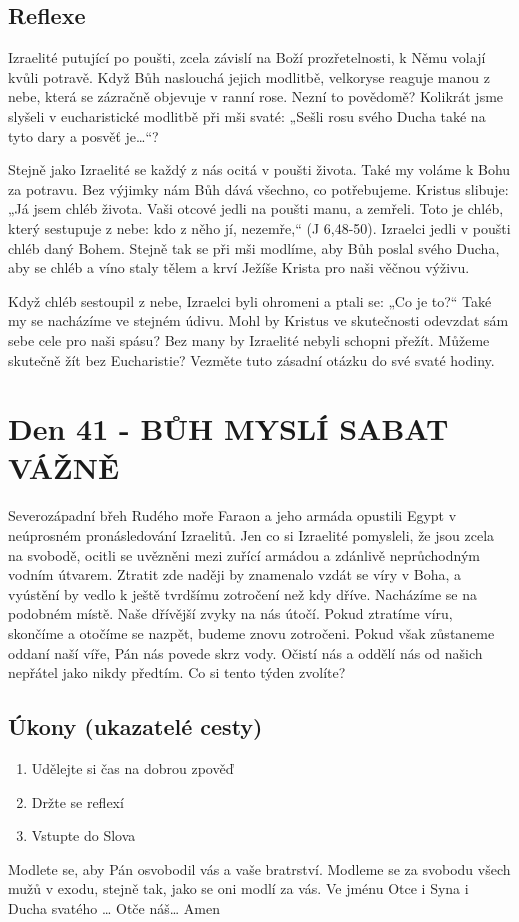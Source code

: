 \documentclass[11pt]{article}
\newcommand{\zacatekSestyTyden}{
  Severozápadní břeh Rudého moře \newline 
  Faraon a jeho armáda opustili Egypt v neúprosném pronásledování Izraelitů. Jen co si Izraelité pomysleli, že jsou zcela na svobodě, ocitli se uvězněni mezi zuřící armádou a zdánlivě neprůchodným vodním útvarem. Ztratit zde naději by znamenalo vzdát se víry v Boha, a vyústění by vedlo k ještě tvrdšímu zotročení než kdy dříve. Nacházíme se na podobném místě. Naše dřívější zvyky na nás útočí. Pokud ztratíme víru, skončíme a otočíme se nazpět, budeme znovu zotročeni. Pokud však zůstaneme oddaní naší víře, Pán nás povede skrz vody. Očistí nás a oddělí nás od našich nepřátel jako nikdy předtím. Co si tento týden zvolíte?

\subsection*{Úkony (ukazatelé cesty)}
\begin{enumerate}
  \item Udělejte si čas na dobrou zpověď
  \item Držte se reflexí
  \item Vstupte do Slova
\end{enumerate}
Modlete se, aby Pán osvobodil vás a vaše bratrství. \newline
Modleme se za svobodu všech mužů v exodu, stejně tak, jako se oni modlí za vás.\newline
Ve jménu Otce i Syna i Ducha svatého …  Otče náš… Amen
}
\begin{document}
\subsection*{Reflexe}
Izraelité putující po poušti, zcela závislí na Boží prozřetelnosti, k Němu volají kvůli potravě. Když Bůh naslouchá jejich modlitbě,
velkoryse reaguje manou z nebe, která se zázračně objevuje v ranní rose. Nezní to povědomě? Kolikrát jsme slyšeli
v eucharistické modlitbě při mši svaté: „Sešli rosu svého Ducha také na tyto dary a posvěť je…“?

Stejně jako Izraelité se každý z nás ocitá v poušti života. Také my voláme k Bohu za potravu. Bez výjimky nám Bůh dává všechno,
co potřebujeme. Kristus slibuje: „Já jsem chléb života. Vaši otcové jedli na poušti manu, a zemřeli. Toto je chléb, který sestupuje z
nebe: kdo z něho jí, nezemře,“ (J 6,48-50). Izraelci jedli v poušti chléb daný Bohem. Stejně tak se při mši modlíme, aby Bůh poslal
svého Ducha, aby se chléb a víno staly tělem a krví Ježíše Krista pro naši věčnou výživu.

Když chléb sestoupil z nebe, Izraelci byli ohromeni a ptali se: „Co je to?“ Také my se nacházíme ve stejném údivu. Mohl by
Kristus ve skutečnosti odevzdat sám sebe cele pro naši spásu? Bez many by Izraelité nebyli schopni přežít. Můžeme skutečně žít
bez Eucharistie? Vezměte tuto zásadní otázku do své svaté hodiny.



\newpage
\section{Den 41 - BŮH MYSLÍ SABAT VÁŽNĚ }
\zacatekSestyTyden
\end{document}
